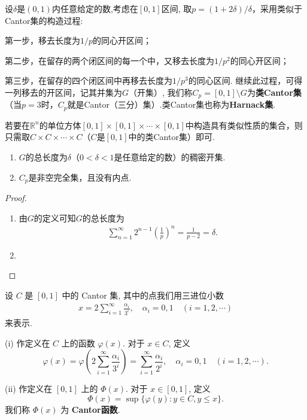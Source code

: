\documentclass[../../main.tex]{subfiles}
\begin{document}
\begin{definition}[类Cantor集]
设$\delta$是$(0,1)$内任意给定的数,考虑在$[0,1]$区间, 取$p=(1 + 2\delta)/\delta$，采用类似于Cantor集的构造过程:

第一步，移去长度为$1/p$的同心开区间；

第二步，在留存的两个闭区间的每一个中，又移去长度为$1/p^2$的同心开区间；

第三步，在留存的四个闭区间中再移去长度为$1/p^3$的同心区间. 继续此过程，可得一列移去的开区间，记其并集为$G$（开集）,
我们称$C_p=[0,1]\setminus G$为\textbf{类Cantor集}（当$p = 3$时，$C_p$就是Cantor（三分）集）.类Cantor集也称为\textbf{Harnack集}. 
\end{definition}
\begin{remark}
若要在$\mathbb{R}^n$的单位方体$[0,1]\times[0,1]\times\cdots\times[0,1]$中构造具有类似性质的集合，则只需取$C\times C\times\cdots\times C$（$C$是$[0,1]$中的类Cantor集）即可.
\end{remark}

\begin{theorem}[类Cantor集的基本性质]\label{theorem:类Cantor集的基本性质}
\begin{enumerate}[(1)]
\item $G$的总长度为$\delta$（$0<\delta<1$是任意给定的数）的稠密开集.

\item $C_p$是非空完全集，且没有内点.
\end{enumerate}
\end{theorem}
\begin{proof}
\begin{enumerate}[(1)]
\item 由$G$的定义可知$G$的总长度为
\begin{align*}
\sum_{n = 1}^{\infty}2^{n - 1}\left(\frac{1}{p}\right)^n=\frac{1}{p - 2}=\delta.
\end{align*}

\item 
\end{enumerate}

\end{proof}

\begin{definition}[Cantor函数]\label{definition:Cantor函数}
设 \(C\) 是 \([0,1]\) 中的 Cantor 集, 其中的点我们用三进位小数
\begin{align*}
x = 2\sum_{i = 1}^{\infty}\frac{\alpha_i}{3^i}, \quad \alpha_i = 0,1 \quad (i = 1,2,\cdots)
\end{align*}
来表示.

(i) 作定义在 \(C\) 上的函数 \(\varphi(x)\). 对于 \(x \in C\), 定义
\[
\varphi(x)=\varphi\left(2\sum_{i = 1}^{\infty}\frac{\alpha_i}{3^i}\right)=\sum_{i = 1}^{\infty}\frac{\alpha_i}{2^i}, \quad \alpha_i = 0,1 \quad (i = 1,2,\cdots).
\]

(ii) 作定义在 \([0,1]\) 上的 \(\varPhi(x)\). 对于 \(x \in [0,1]\), 定义
\[
\varPhi(x)=\sup\{\varphi(y):y\in C,y\leqslant x\}.
\]
我们称 \(\varPhi(x)\) 为 \textbf{Cantor函数}.
\end{definition}
\end{document}
